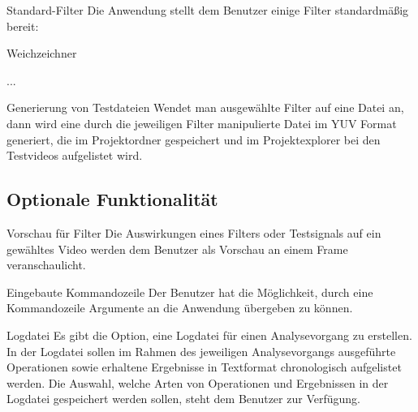  Standard-Filter
\newline
Die Anwendung stellt dem Benutzer einige Filter standardmäßig bereit:
\begin{compactItem}
\item Weichzeichner
\item ...
\end{compactItem}

 Generierung von Testdateien
\newline
Wendet man ausgewählte Filter auf eine Datei an, dann wird eine durch die jeweiligen Filter manipulierte Datei im \gls{YUV} Format generiert, die im Projektordner gespeichert und im Projektexplorer bei den Testvideos aufgelistet wird.





\subsection{Optionale Funktionalität}

 Vorschau für Filter
\newline
Die Auswirkungen eines Filters oder Testsignals auf ein gewähltes Video werden dem Benutzer als Vorschau an einem Frame veranschaulicht.


 Eingebaute Kommandozeile
\newline
Der Benutzer hat die Möglichkeit, durch eine Kommandozeile Argumente an die Anwendung übergeben zu können.

 Logdatei
\newline
Es gibt die Option, eine Logdatei für einen Analysevorgang zu erstellen. In der Logdatei sollen im Rahmen
 des jeweiligen Analysevorgangs ausgeführte Operationen sowie erhaltene Ergebnisse in Textformat
  chronologisch aufgelistet werden. Die Auswahl, welche Arten von Operationen und Ergebnissen in der
   Logdatei gespeichert werden sollen, steht dem Benutzer zur Verfügung.
